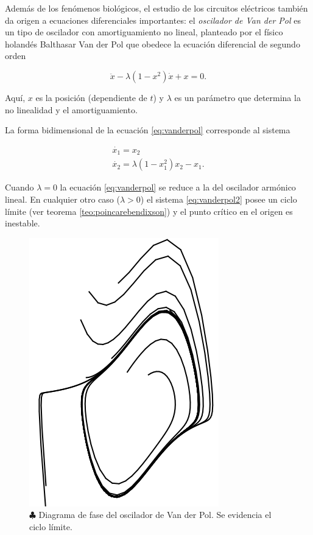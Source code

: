 \newpage
\begin{example} \label{ex:vanderpol}

Además de los fenómenos biológicos, el estudio de los circuitos eléctricos también da origen a ecuaciones diferenciales importantes: el \emph{oscilador de Van der Pol} es un tipo de oscilador con amortiguamiento no lineal, planteado por el físico holandés Balthasar Van der Pol \cite{vanderpol} que obedece la ecuación diferencial de segundo orden

\begin{equation} \label{eq:vanderpol}
	\ddot{x} - \lambda (1-x^2)\dot{x} + x = 0.
\end{equation}

Aquí, $x$ es la posición (dependiente de $t$) y $\lambda$ es un parámetro que determina la no linealidad y el amortiguamiento.

La forma bidimensional de la ecuación \ref{eq:vanderpol} corresponde al sistema

\begin{equation} \label{eq:vanderpol2}
	\begin{array}{l}
		\dot{x_1} = x_2 \\
		\dot{x_2} = \lambda (1-x_1^2)x_2 - x_1.
	\end{array}	
\end{equation}

Cuando $\lambda = 0$ la ecuación \ref{eq:vanderpol} se reduce a la del oscilador armónico lineal. En cualquier otro caso ($\lambda > 0$) el sistema \ref{eq:vanderpol2} posee un ciclo límite (ver teorema \ref{teo:poincarebendixson}) y el punto crítico en el origen es inestable.

\begin{figure}[!ht] \centering
	\includegraphics[scale=0.45]{figures/vanderpol.png}
	\caption{$\clubsuit$ Diagrama de fase del oscilador de Van der Pol. Se evidencia el ciclo límite.}
	\label{fig:vanderpol}
\end{figure}

\end{example}
